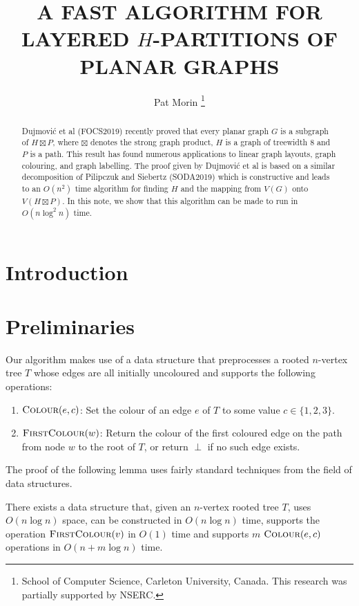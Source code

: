 \documentclass[kpfonts]{patmorin}
\title{\MakeUppercase{A Fast Algorithm for Layered $H$-Partitions of Planar Graphs}}
\author{
  Pat Morin%
    \thanks{School of Computer Science, Carleton University, Canada. This research was partially supported by NSERC.}
}
\date{}
\begin{document}
\begin{titlepage}
\maketitle

\begin{abstract}
  Dujmović et al (FOCS2019) recently proved that every planar graph $G$ is a subgraph of $H\boxtimes P$, where $\boxtimes$ denotes the strong graph product, $H$ is a graph of treewidth 8 and $P$ is a path.  This result has found numerous applications to linear graph layouts, graph colouring, and graph labelling.  The proof given by Dujmović et al is based on a similar decomposition of Pilipczuk and Siebertz (SODA2019) which is constructive and leads to an $O(n^2)$ time algorithm for finding $H$ and the mapping from $V(G)$ onto $V(H\boxtimes P)$.  In this note, we show that this algorithm can be made to run in $O(n\log^2 n)$ time.
\end{abstract}
\end{titlepage}
\tableofcontents

\newpage

\setcounter{page}{0}
\section{Introduction}

\section{Preliminaries}

Our algorithm makes use of a data structure that preprocesses a rooted $n$-vertex tree $T$ whose edges are all initially uncoloured and supports the following operations:
\begin{enumerate}
  \item $\textsc{Colour}(e,c)$: Set the colour of an edge $e$ of $T$ to some value $c\in\{1,2,3\}$.
  \item $\textsc{FirstColour}(w)$: Return the colour of the first coloured edge on the path from node $w$ to the root of $T$, or return $\perp$ if no such edge exists.
\end{enumerate}

The proof of the following lemma uses fairly standard techniques from the field of data structures.

\begin{lem}
  There exists a data structure that, given an $n$-vertex rooted tree $T$, uses $O(n\log n)$ space, can be constructed in $O(n\log n)$ time, supports the operation $\textsc{FirstColour}(v)$ in $O(1)$ time and supports $m$ $\textsc{Colour}(e,c)$ operations in $O(n+m\log n)$ time.
\end{lem}
\end{document}
